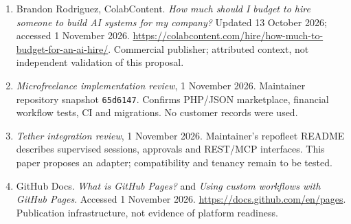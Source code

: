 \begin{enumerate}
\item Brandon Rodriguez, ColabContent. \emph{How much should I budget to hire someone to build AI systems for my company?} Updated 13 October 2026; accessed 1 November 2026. \url{https://colabcontent.com/hire/how-much-to-budget-for-an-ai-hire/}. Commercial publisher; attributed context, not independent validation of this proposal.
\item \emph{Microfreelance implementation review}, 1 November 2026. Maintainer repository snapshot \texttt{65d6147}. Confirms PHP/JSON marketplace, financial workflow tests, CI and migrations. No customer records were used.
\item \emph{Tether integration review}, 1 November 2026. Maintainer's repofleet README describes supervised sessions, approvals and REST/MCP interfaces. This paper proposes an adapter; compatibility and tenancy remain to be tested.
\item GitHub Docs. \emph{What is GitHub Pages?} and \emph{Using custom workflows with GitHub Pages}. Accessed 1 November 2026. \url{https://docs.github.com/en/pages}. Publication infrastructure, not evidence of platform readiness.
\end{enumerate}
